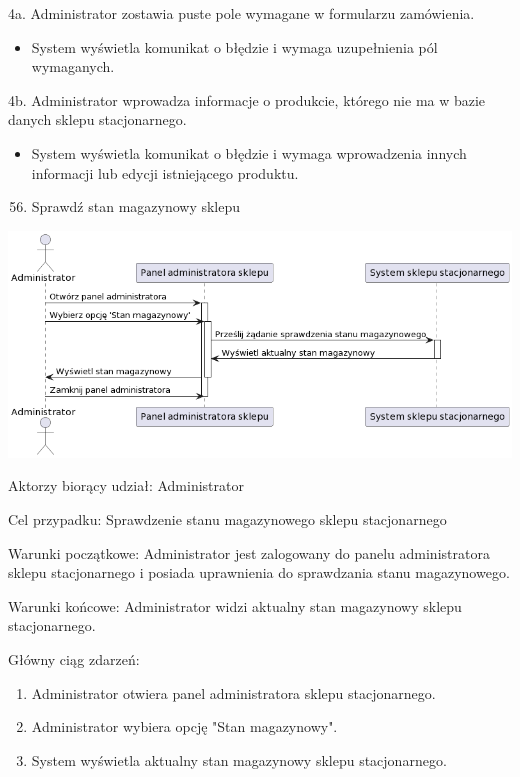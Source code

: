 \documentclass[
]{article}
\providecommand{\tightlist}{%
  \setlength{\itemsep}{0pt}\setlength{\parskip}{0pt}}
\begin{document}
{4a. Administrator zostawia puste pole wymagane w formularzu
zamówienia.}

\begin{itemize}
\tightlist
\item
  {System wyświetla komunikat o błędzie i wymaga uzupełnienia pól
  wymaganych.}
\end{itemize}

{4b. Administrator wprowadza informacje o produkcie, którego nie ma w
bazie danych sklepu stacjonarnego.}

\begin{itemize}
\tightlist
\item
  {System wyświetla komunikat o błędzie i wymaga wprowadzenia innych
  informacji lub edycji istniejącego produktu.}
\end{itemize}

{}

\begin{enumerate}
\setcounter{enumi}{55}
\tightlist
\item
  {Sprawdź stan magazynowy sklepu}
\end{enumerate}

{\includegraphics{diagrams/sequence/sklep_sprawdz_stan_magazynowy.png}}

{Aktorzy biorący udział: Administrator}

{Cel przypadku: Sprawdzenie stanu magazynowego sklepu stacjonarnego}

{Warunki początkowe: Administrator jest zalogowany do panelu
administratora sklepu stacjonarnego i posiada uprawnienia do sprawdzania
stanu magazynowego.}

{Warunki końcowe: Administrator widzi aktualny stan magazynowy sklepu
stacjonarnego.}

{Główny ciąg zdarzeń:}

\begin{enumerate}
\tightlist
\item
  {Administrator otwiera panel administratora sklepu stacjonarnego.}
\item
  {Administrator wybiera opcję "Stan magazynowy".}
\item
  {System wyświetla aktualny stan magazynowy sklepu stacjonarnego.}
\end{enumerate}
\end{document}
